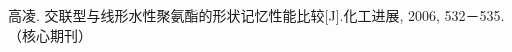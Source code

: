 %
%
%

\begin{publications}{99}
  \item\textsc{高凌}. {交联型与线形水性聚氨酯的形状记忆性能比较}[J].化工进展, 2006, 532－535.（核心期刊）
\end{publications}

